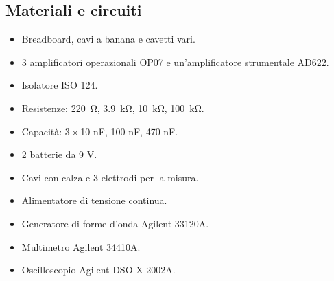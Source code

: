 \subsection{Materiali e circuiti}

\begin{itemize}
    \item{Breadboard, cavi a banana e cavetti vari.}
    \item{3 amplificatori operazionali OP07 e un'amplificatore strumentale AD622.}
    \item{Isolatore ISO 124.}
    \item{Resistenze: \SI{220}{\ohm}, \SI{3.9}{\kilo\ohm}, \SI{10}{\kilo\ohm}, \SI{100}{\kilo\ohm}.}
    \item{Capacità: $3\times$10 nF, 100 nF, 470 nF.}
    \item{2 batterie da 9 V.}
    \item{Cavi con calza e 3 elettrodi per la misura.}
    \item{Alimentatore di tensione continua.}
    \item{Generatore di forme d'onda Agilent 33120A.}
    \item{Multimetro Agilent 34410A.}
    \item{Oscilloscopio Agilent DSO-X 2002A.}
\end{itemize}

